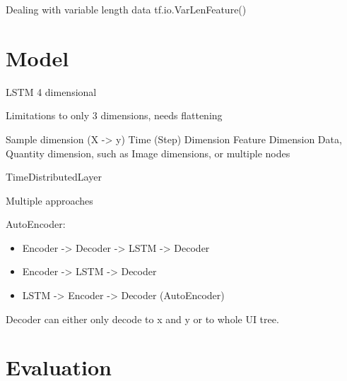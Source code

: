 Dealing with variable length data tf.io.VarLenFeature()

\section{Model}


LSTM 4 dimensional

Limitations to only 3 dimensions, needs flattening

Sample dimension (X -> y)
Time (Step) Dimension
Feature Dimension
Data, Quantity dimension, such as Image dimensions, or multiple nodes

TimeDistributedLayer


Multiple approaches


AutoEncoder:

\begin{itemize}
  \item Encoder -> Decoder -> LSTM -> Decoder
  \item Encoder -> LSTM -> Decoder
  \item LSTM -> Encoder -> Decoder (AutoEncoder)
\end{itemize}

Decoder can either only decode to x and y or to whole UI tree.

\section{Evaluation}

